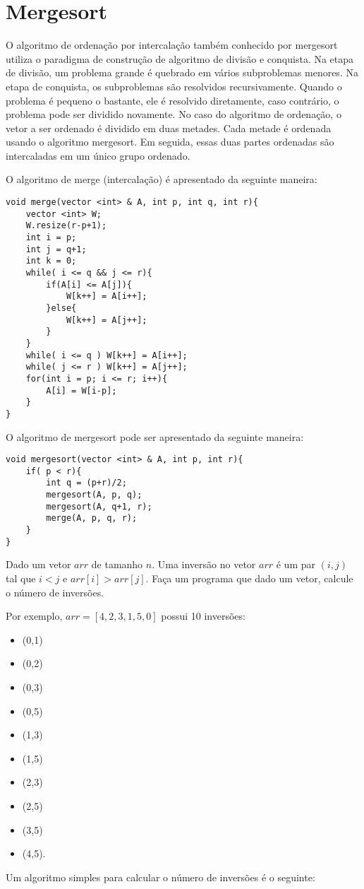 \section{Mergesort}

O algoritmo de ordenação por intercalação também conhecido por mergesort utiliza o paradigma de construção de algoritmo de divisão e conquista. Na etapa de divisão, um problema grande é quebrado em vários subproblemas menores. Na etapa de conquista, os subproblemas são resolvidos recursivamente. Quando o problema é pequeno o bastante, ele é resolvido diretamente, caso contrário, o problema pode ser dividido novamente. No caso do algoritmo de ordenação, o vetor a ser ordenado é dividido em duas metades. Cada metade é ordenada usando o algoritmo mergesort. Em seguida, essas duas partes ordenadas são intercaladas em um único grupo ordenado.

O algoritmo de merge (intercalação) é apresentado da seguinte maneira:

\begin{verbatim}
void merge(vector <int> & A, int p, int q, int r){
    vector <int> W;
    W.resize(r-p+1);
    int i = p;
    int j = q+1;
    int k = 0;
    while( i <= q && j <= r){
        if(A[i] <= A[j]){
            W[k++] = A[i++];
        }else{
            W[k++] = A[j++];
        }
    }
    while( i <= q ) W[k++] = A[i++];
    while( j <= r ) W[k++] = A[j++];
    for(int i = p; i <= r; i++){
        A[i] = W[i-p];
    } 
}

\end{verbatim}

O algoritmo de mergesort pode ser apresentado da seguinte maneira:

\begin{verbatim}
void mergesort(vector <int> & A, int p, int r){
    if( p < r){
        int q = (p+r)/2;
        mergesort(A, p, q);
        mergesort(A, q+1, r);
        merge(A, p, q, r);
    }
}

\end{verbatim}


\begin{exemplo}
Dado um vetor $arr$ de tamanho $n$. Uma inversão no vetor $arr$ é um par $(i,j)$ tal que $i < j$ e $arr[i] > arr[j]$. Faça um programa que dado um vetor, calcule o número de inversões. 

Por exemplo, $arr = [4,2,3,1,5,0]$ possui 10 inversões: 
\begin{itemize}
\item (0,1)
\item (0,2)
\item (0,3)
\item (0,5)
\item (1,3)
\item (1,5)
\item (2,3)
\item (2,5)
\item (3,5) 
\item (4,5).
\end{itemize}

Um algoritmo simples para calcular o número de inversões é o seguinte:
\end{exemplo}


